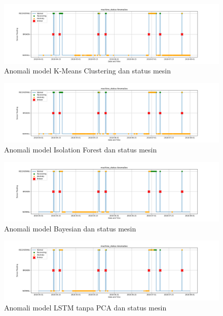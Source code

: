 \documentclass[12pt, a4paper, onecolumn, oneside, final]{report}
\begin{document}
    \begin{figure}[h]
        \centerline{\includegraphics[width=1.4\textwidth]{resources/Acuan/KMeans_machine_status.png}}
        \caption{Anomali model K-Means Clustering dan status mesin} \label{KMms}
    \end{figure}
    \begin{figure}[h]
        \centerline{\includegraphics[width=1.4\textwidth]{resources/Acuan/IsoFor_machine_status.png}}
        \caption{Anomali model Isolation Forest dan status mesin} \label{IFms}
    \end{figure}
    \begin{figure}[h]
        \centerline{\includegraphics[width=1.4\textwidth]{resources/Bayes/Bayes_machine_status.png}}
        \caption{Anomali model Bayesian dan status mesin} \label{Bms}
    \end{figure}
    \begin{figure}[h]
        \centerline{\includegraphics[width=1.4\textwidth]{resources/LSTM/LSTM_noPCA_machine_status.png}}
        \caption{Anomali model LSTM tanpa PCA dan status mesin} \label{nPms}
    \end{figure}
\end{document}
